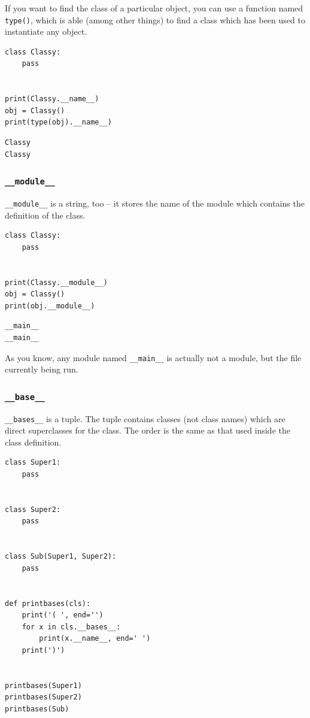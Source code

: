 \documentclass[11pt]{article}
\begin{document}
If you want to find the class of a particular object, you can use a
function named \texttt{type()}, which is able (among other things) to find a
class which has been used to instantiate any object.

\begin{verbatim}
class Classy:
	pass


print(Classy.__name__)
obj = Classy()
print(type(obj).__name__)
\end{verbatim}

\begin{verbatim}
Classy
Classy
\end{verbatim}

\subsubsection{\texttt{\_\_module\_\_}}
\label{sec:org7335742}
\texttt{\_\_module\_\_} is a string, too – it stores the name of the module which
contains the definition of the class.

\begin{verbatim}
class Classy:
    pass


print(Classy.__module__)
obj = Classy()
print(obj.__module__)
\end{verbatim}

\begin{verbatim}
__main__
__main__
\end{verbatim}

As you know, any module named \texttt{\_\_main\_\_} is actually not a module, but
the file currently being run.

\subsubsection{\texttt{\_\_base\_\_}}
\label{sec:org0f7c601}
\texttt{\_\_bases\_\_} is a tuple. The tuple contains classes (not class names)
which are direct superclasses for the class. The order is the same as
that used inside the class definition.

\begin{verbatim}
class Super1:
	pass


class Super2:
	pass


class Sub(Super1, Super2):
	pass


def printbases(cls):
	print('( ', end='')
	for x in cls.__bases__:
		print(x.__name__, end=' ')
	print(')')


printbases(Super1)
printbases(Super2)
printbases(Sub)

\end{verbatim}
\end{document}
